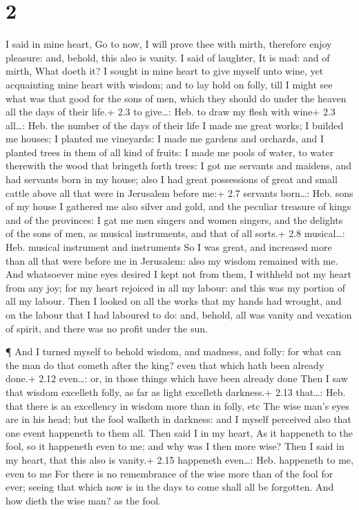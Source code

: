 \hypertarget{section-1}{%
\section{2}\label{section-1}}

 I said in mine heart, Go to now, I will prove thee with
mirth, therefore enjoy pleasure: and, behold, this also is vanity.
 I said of laughter, It is mad: and of mirth, What doeth it?
 I sought in mine heart to give myself unto wine, yet
acquainting mine heart with wisdom; and to lay hold on folly, till I
might see what was that good for the sons of men, which they should do
under the heaven all the days of their life.+ 2.3 to give\ldots: Heb. to
draw my flesh with wine+ 2.3 all\ldots: Heb. the number of the days of
their life  I made me great works; I builded me houses; I
planted me vineyards:  I made me gardens and orchards, and I
planted trees in them of all kind of fruits:  I made me
pools of water, to water therewith the wood that bringeth forth trees:
 I got me servants and maidens, and had servants born in my
house; also I had great possessions of great and small cattle above all
that were in Jerusalem before me:+ 2.7 servants born\ldots: Heb. sons of
my house  I gathered me also silver and gold, and the
peculiar treasure of kings and of the provinces: I gat me men singers
and women singers, and the delights of the sons of men, as musical
instruments, and that of all sorts.+ 2.8 musical\ldots: Heb. musical
instrument and instruments  So I was great, and increased
more than all that were before me in Jerusalem: also my wisdom remained
with me.  And whatsoever mine eyes desired I kept not from
them, I withheld not my heart from any joy; for my heart rejoiced in all
my labour: and this was my portion of all my labour.  Then
I looked on all the works that my hands had wrought, and on the labour
that I had laboured to do: and, behold, all was vanity and vexation of
spirit, and there was no profit under the sun.

 ¶ And I turned myself to behold wisdom, and madness, and
folly: for what can the man do that cometh after the king? even that
which hath been already done.+ 2.12 even\ldots: or, in those things
which have been already done  Then I saw that wisdom
excelleth folly, as far as light excelleth darkness.+ 2.13 that\ldots:
Heb. that there is an excellency in wisdom more than in folly, etc
 The wise man's eyes are in his head; but the fool walketh
in darkness: and I myself perceived also that one event happeneth to
them all.  Then said I in my heart, As it happeneth to the
fool, so it happeneth even to me; and why was I then more wise? Then I
said in my heart, that this also is vanity.+ 2.15 happeneth even\ldots:
Heb. happeneth to me, even to me  For there is no
remembrance of the wise more than of the fool for ever; seeing that
which now is in the days to come shall all be forgotten. And how dieth
the wise man? as the fool.

